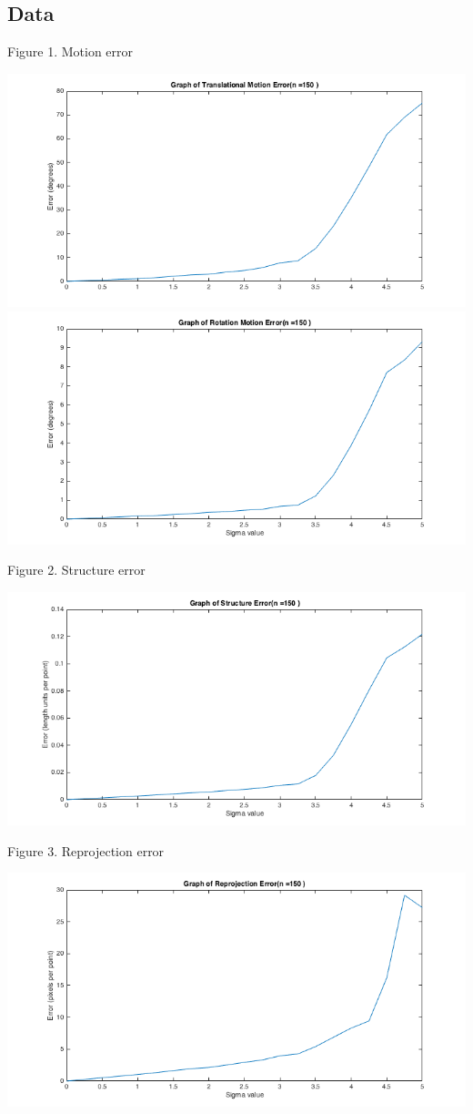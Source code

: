 \documentclass{article}
\begin{document}
\newpage
\subsection{Data}
\begin{center}
	\begin{center}Figure 1. Motion error\end{center}
	\includegraphics[width=.7\textwidth,keepaspectratio]{translation_motion_error.png}
	\includegraphics[width=.7\textwidth,keepaspectratio]{rotation_motion_error.png}
	\begin{center}Figure 2. Structure error\end{center}
	\includegraphics[width=.7\textwidth,keepaspectratio]{structure_error.png}
	\newpage

	\begin{center}Figure 3. Reprojection error\end{center}
	\includegraphics[width=.7\textwidth,keepaspectratio]{reprojection_error.png}


\end{center}
\end{document}
